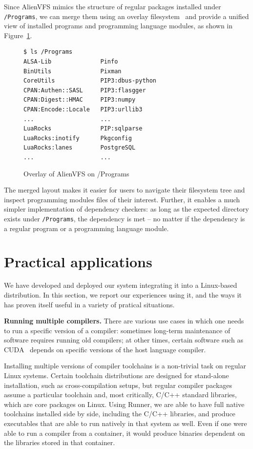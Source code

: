 \documentclass[sigplan, anonymous, 10pt]{acmart}
\begin{document}
Since AlienVFS mimics the structure of regular packages installed under
\texttt{/Programs}, we can merge them using an overlay filesystem~\cite{brown2018:overlayfs}
and provide a unified view of installed programs and programming language modules, as
shown in Figure~\ref{fig:alienvfs.merged}.

\begin{figure}[h]
    \begin{Verbatim}[frame=single]
$ ls /Programs
ALSA-Lib              Pinfo
BinUtils              Pixman
CoreUtils             PIP3:dbus-python
CPAN:Authen::SASL     PIP3:flasgger
CPAN:Digest::HMAC     PIP3:numpy
CPAN:Encode::Locale   PIP3:urllib3
...                   ...
LuaRocks              PIP:sqlparse
LuaRocks:inotify      Pkgconfig
LuaRocks:lanes        PostgreSQL
...                   ...
    \end{Verbatim}
    \caption{Overlay of AlienVFS on /Programs}
    \label{fig:alienvfs.merged}
\end{figure}

The merged layout makes it easier for users to navigate their filesystem tree
and inspect programming modules files of their interest. Further, it enables a
much simpler implementation of dependency checkers: as long as the expected
directory exists under \texttt{/Programs}, the dependency is met -- no matter if the
dependency is a regular program or a programming language module.

\section{Practical applications}\label{sec:applications}
We have developed and deployed our system integrating it into a Linux-based
distribution. In this section, we report our experiences using it, and the ways it has
proven itself useful in a variety of pratical situations.

\textbf{Running multiple compilers.}
There are various use cases in which one needs to run a specific version of
a compiler: sometimes long-term maintenance of software requires running
old compilers; at other times, certain software such as CUDA~\cite{nickolls2008:cuda}
depends on specific versions of the host language compiler.

Installing multiple versions of compiler toolchains is a non-trivial task on regular
Linux systems. Certain toolchain distributions are designed for stand-alone
installation, such as cross-compilation setups, but regular compiler packages
assume a particular toolchain and, most critically, C/C++ standard libraries, which
are core packages on Linux. Using Runner, we are able to have full native
toolchains installed side by side, including the C/C++ libraries, and produce
executables that are able to run natively in that system as well. Even if one
were able to run a compiler from a container, it would produce binaries dependent
on the libraries stored in that container.
\end{document}
